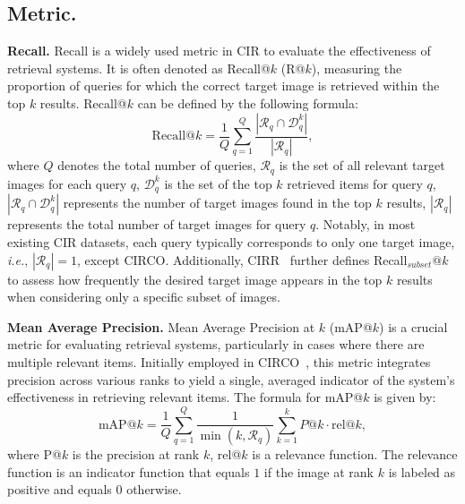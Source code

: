 \subsection{Metric.}
\textbf{Recall.} Recall is a widely used metric in CIR to evaluate the effectiveness of retrieval systems. It is often denoted as Recall@$k$ (R@$k$), measuring the proportion of queries for which the correct target image is retrieved within the top $k$ results. Recall@$k$ can be defined by the following formula:
\begin{equation}
    {\text{Recall}@k} = \frac{1}{Q} \sum_{q=1}^{Q} \frac{| \mathcal{R}_q \cap \mathcal{D}_q^k |}{| \mathcal{R}_q |} ,
\end{equation}
where $Q$ denotes the total number of queries, $\mathcal{R}_q$ is the set of all relevant target images for each query $q$, $\mathcal{D}_q^k$ is the set of the top $k$ retrieved items for query $q$, $| \mathcal{R}_q \cap \mathcal{D}_q^k|$ represents the number of target images found in the top $k$ results, $| \mathcal{R}_q |$ represents the total number of target images for query $q$. Notably, in most existing CIR datasets, each query typically corresponds to only one target image, \textit{i.e.}, $| \mathcal{R}_q |=1$, except CIRCO. Additionally, CIRR~\cite{liu2021CIRPLANT} further defines Recall\(_{subset}@k\) to assess how frequently the desired target image appears in the top $k$ results when considering only a specific subset of images. 

\textbf{Mean Average Precision.}
Mean Average Precision at $k$ (mAP@$k$) is a crucial metric for evaluating retrieval systems, particularly in cases where there are multiple relevant items. Initially employed in CIRCO~\cite{searle}, this metric integrates precision across various ranks to yield a single, averaged indicator of the system's effectiveness in retrieving relevant items. The formula for mAP@$k$ is given by:
\begin{equation}
    \text{mAP}@k = \frac{1}{Q} \sum_{q=1}^{Q} \frac{1}{\min(k, \mathcal{R}_q)} \sum_{k=1}^{k} P@k \cdot \text{rel}@k,
\end{equation}
where P@$k$ is the precision at rank $k$, rel@$k$ is a relevance function. The relevance function is an indicator function that equals $1$ if the image at rank $k$ is labeled as positive and equals $0$ otherwise.


